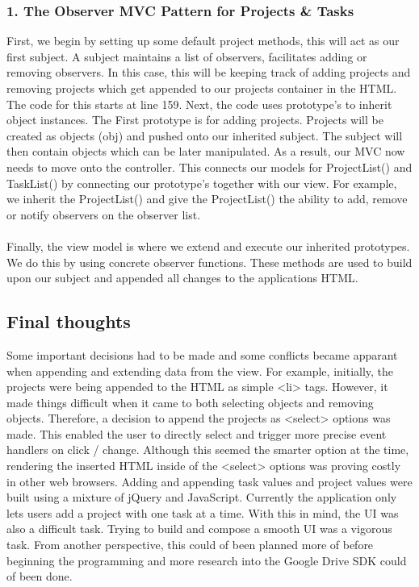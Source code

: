 \documentclass[paper=a4, fontsize=10pt]{article}
\begin{document}
\subsubsection*{1. The Observer MVC Pattern for Projects \& Tasks}
First, we begin by setting up some default project methods, this will act as our first subject. A subject maintains a list of observers, facilitates adding or removing observers. In this case, this will be keeping track of adding projects and removing projects which get appended to our projects container in the HTML. The code for this starts at line 159. Next, the code uses prototype's to inherit object instances. The First prototype is for adding projects. Projects will be created as objects (obj) and pushed onto our inherited subject. The subject will then contain objects which can  be later manipulated. 
\clearpage
As a result, our MVC now needs to move onto the controller. This connects our models for ProjectList() and TaskList() by connecting our prototype's together with our view. For example, we inherit the ProjectList() and give the ProjectList() the ability to add, remove or notify observers on the observer list. 
\\\\ 
Finally, the view model is where we extend and execute our inherited prototypes. We do this by using concrete observer functions. These methods are used to build upon our subject and appended all changes to the applications HTML. 

\subsection*{Final thoughts}
Some important decisions had to be made and some conflicts became apparant when appending and extending data from the view. For example, initially, the projects were being appended to the HTML as simple <li> tags. However, it made things difficult when it came to both selecting objects and removing objects. Therefore, a decision to append the projects as <select> options was made. This enabled the user to directly select and trigger more precise event handlers on click / change. Although this seemed the smarter option at the time, rendering the inserted HTML inside of the <select> options was proving costly in other web browsers.  Adding and appending task values and project values were built using a mixture of jQuery and JavaScript. Currently the application only lets users add a project with one task at a time. With this in mind, the UI was also a difficult task. Trying to build and compose a smooth UI was a vigorous task. From another perspective, this could of been planned more of before beginning the programming and more research into the Google Drive SDK could of been done. 
\end{document}
